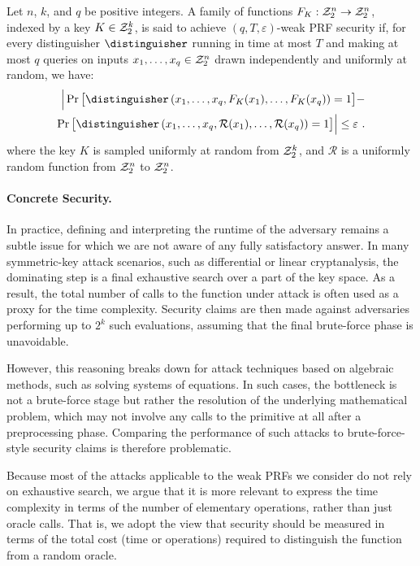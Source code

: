 \begin{definition}
Let $n$, $k$, and $q$ be positive integers. A family of functions $F_K : \mathcal{Z}_2^n \to \mathcal{Z}_2^n$, indexed by a key $K \in \mathcal{Z}_2^k$, is said to achieve $(q,T,\varepsilon)$-weak PRF security if, for every distinguisher $\distinguisher$ running in time at most $T$ and making at most $q$ queries on inputs $x_1, \dots, x_q \in \mathcal{Z}_2^n$ drawn independently and uniformly at random, we have:
\begin{equation*}
  \begin{split}
    \Big| 
    \Pr\big[ 
    \distinguisher\left(x_1, \dots, x_q, F_K(x_1), \dots, F_K(x_q)\right) = 1 
    \big]
    - \\
    \Pr\big[ 
    \distinguisher\left(x_1, \dots, x_q, \mathcal{R}(x_1), \dots, \mathcal{R}(x_q)\right) = 1 
    \big]
    \Big| \leq \varepsilon~.
  \end{split}
\end{equation*}
where the key $K$ is sampled uniformly at random from $\mathcal{Z}_2^k$, and $\mathcal{R}$ is a uniformly random function from $\mathcal{Z}_2^n$ to $\mathcal{Z}_2^n$.
\end{definition}


\paragraph{Concrete Security.}
In practice, defining and interpreting the runtime of the adversary remains a subtle issue for which we are not aware of any fully satisfactory answer. In many symmetric-key attack scenarios, such as differential or linear cryptanalysis, the dominating step is a final exhaustive search over a part of the key space. As a result, the total number of calls to the function under attack is often used as a proxy for the time complexity. Security claims are then made against adversaries performing up to $2^k$ such evaluations, assuming that the final brute-force phase is unavoidable.

However, this reasoning breaks down for attack techniques based on algebraic methods, such as solving systems of equations. In such cases, the bottleneck is not a brute-force stage but rather the resolution of the underlying mathematical problem, which may not involve any calls to the primitive at all after a preprocessing phase. Comparing the performance of such attacks to brute-force-style security claims is therefore problematic.

Because most of the attacks applicable to the weak PRFs we consider do not rely on exhaustive search, we argue that it is more relevant to express the time complexity in terms of the number of elementary operations, rather than just oracle calls. That is, we adopt the view that security should be measured in terms of the total cost (time or operations) required to distinguish the function from a random oracle.

